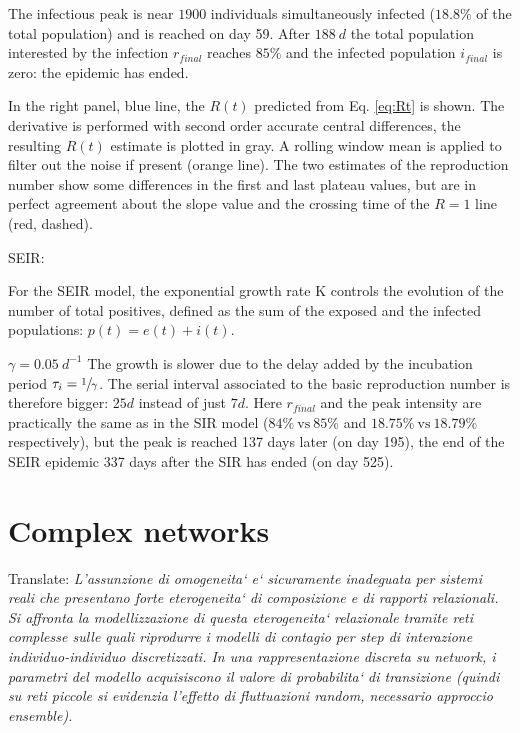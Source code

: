 \documentclass[DIV=12, BCOR=0pt]{scrartcl}  %
\begin{document}
	The infectious peak is near $1900$ individuals simultaneously infected ($18.8 \%$ of the total population) and is reached on day 59. After $188 \ d$ the total population interested by the infection $r_{final}$ reaches $85 \%$ and the infected population $i_{final}$ is zero: the epidemic has ended. 
	
	In the right panel, blue line, the $R(t)$ predicted from Eq. \ref{eq:Rt} is shown. 
	The derivative is performed with second order accurate central differences, the resulting $R(t)$ estimate is plotted in gray. A rolling window mean is applied to filter out the noise if present (orange line). The two estimates of the reproduction number show some differences in the first and last plateau values, but are in perfect agreement about the slope value and the crossing time of the $R = 1$ line (red, dashed).
	
	
	SEIR:	
	
	For the SEIR model, the exponential growth rate K controls the evolution of the number of total positives, defined as the sum of the exposed and the infected populations: $p(t) = e(t) + i(t)$. 
	
	
	$\gamma = 0.05 \ d^{-1}$ The growth is slower due to the delay added by the incubation period $\tau_{i}=\sfrac{1}{\gamma}$. The serial interval associated to the basic reproduction number is therefore bigger: $25 d$ instead of just $7 d$. Here $r_{final}$ and the peak intensity are practically the same as in the SIR model ($84 \% \ \mathrm{vs} \ 85 \%$ and $18.75 \% \ \mathrm{vs} \ 18.79 \% \ $ respectively), but the peak is reached 137 days later (on day 195), the end of the SEIR epidemic 337 days after the SIR has ended (on day 525). %
  
  
  
  \section{Complex networks}
  Translate: \textit{L'assunzione di omogeneita` e` sicuramente inadeguata per sistemi reali che presentano forte eterogeneita` di composizione e di rapporti relazionali. Si affronta la modellizzazione di questa eterogeneita` relazionale tramite reti complesse sulle quali riprodurre i modelli di contagio per step di interazione individuo-individuo discretizzati. In una rappresentazione discreta su network, i parametri del modello acquisiscono il valore di probabilita` di transizione (quindi su reti piccole si evidenzia l'effetto di fluttuazioni random, necessario approccio ensemble).  }
  
\end{document}
